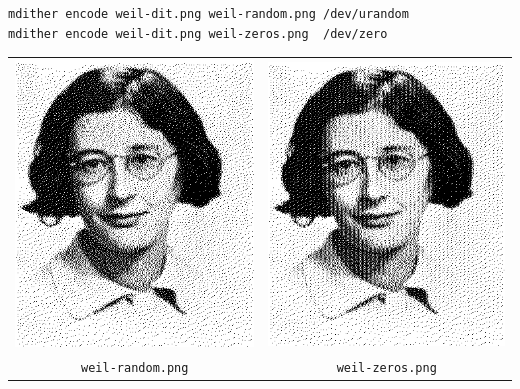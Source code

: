 \begin{verbatim}
mdither encode weil-dit.png weil-random.png /dev/urandom
mdither encode weil-dit.png weil-zeros.png  /dev/zero
\end{verbatim}
\begin{tabular}{cc}
	\includegraphics{weil-random.png} &
	\includegraphics{weil-zeros.png} \\
	\verb+weil-random.png+ &
	\verb+weil-zeros.png+
\end{tabular}

